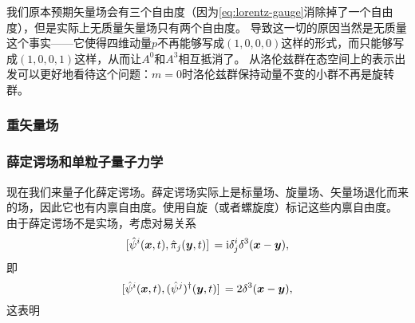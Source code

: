 \documentclass[hyperref, UTF8, a4paper]{ctexart}
\newcommand*{\ii}{\mathrm{i}}
\begin{document}
我们原本预期矢量场会有三个自由度（因为\eqref{eq:lorentz-gauge}消除掉了一个自由度），但是实际上无质量矢量场只有两个自由度。
导致这一切的原因当然是无质量这个事实——它使得四维动量$p$不再能够写成$(1, 0, 0, 0)$这样的形式，而只能够写成$(1,0,0,1)$这样，从而让$A^0$和$A^3$相互抵消了。
从洛伦兹群在态空间上的表示出发可以更好地看待这个问题：$m=0$时洛伦兹群保持动量不变的小群不再是旋转群。



\subsubsection{重矢量场}

\subsubsection{薛定谔场和单粒子量子力学}


现在我们来量子化薛定谔场。薛定谔场实际上是标量场、旋量场、矢量场退化而来的场，因此它也有内禀自由度。使用自旋（或者螺旋度）标记这些内禀自由度。
由于薛定谔场不是实场，考虑对易关系
\[
    \comm*{\hat{\psi}^i(\vb*{x}, t)}{\hat{\pi}_j(\vb*{y}, t)} = \ii \delta^i_j \delta^3 (\vb*{x} - \vb*{y}),
\]
即
\[
    \comm*{\hat{\psi}^i(\vb*{x}, t)}{(\hat{\psi}^j)^\dagger (\vb*{y}, t)} = 2 \delta^3 (\vb*{x} - \vb*{y}),
\]
这表明
\end{document}
